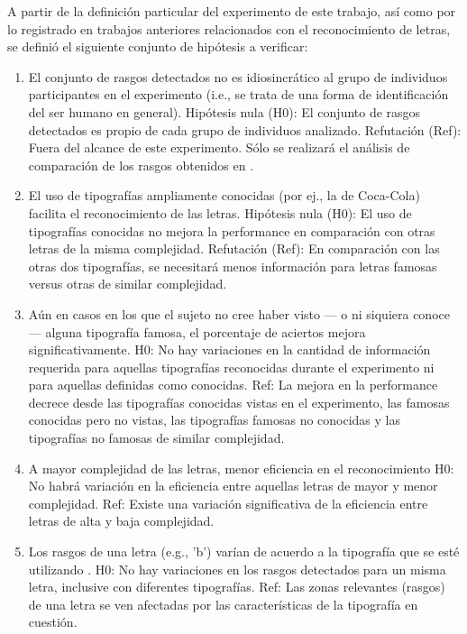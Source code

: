 \documentclass[runningheads,a4paper]{llncs}
\begin{document}
A partir de la definición particular del experimento de este trabajo, así como por lo registrado en trabajos anteriores relacionados con el reconocimiento de letras, se definió el siguiente conjunto de hipótesis a verificar:
\begin{enumerate}
 \item El conjunto de rasgos detectados no es idiosincrático al grupo de individuos participantes en el experimento (i.e., se trata de una forma de identificación del ser humano en general).
    \subitem Hipótesis nula (H0): El conjunto de rasgos detectados es propio de cada grupo de individuos analizado. 
    \subitem Refutación (Ref): Fuera del alcance de este experimento. Sólo se realizará el análisis de comparación de los rasgos obtenidos en \cite{FisetEtAl08:BubblesForLetters}.
 \item El uso de tipografías ampliamente conocidas (por ej., la de Coca-Cola) facilita el reconocimiento de las letras.
    \subitem Hipótesis nula (H0): El uso de tipografías conocidas no mejora la performance en comparación con otras letras de la misma complejidad.
    \subitem Refutación (Ref): En comparación con las otras dos tipografías, se necesitará menos información para letras famosas versus otras de similar complejidad.
 \item Aún en casos en los que el sujeto no cree haber visto --- o ni siquiera conoce --- alguna tipografía famosa, el porcentaje de aciertos mejora significativamente.
    \subitem H0: No hay variaciones en la cantidad de información requerida para aquellas tipografías reconocidas durante el experimento ni para aquellas definidas como conocidas.
    \subitem Ref: La mejora en la performance decrece desde las tipografías conocidas vistas en el experimento, las 
	    famosas conocidas pero no vistas, las tipografías famosas no conocidas y las tipografías no famosas de similar complejidad.
 \item A mayor complejidad de las letras, menor eficiencia en el reconocimiento \cite{PelliEtAl06:LetterIdentification}
    \subitem H0: No habrá variación en la eficiencia entre aquellas letras de mayor y menor complejidad.
    \subitem Ref: Existe una variación significativa de la eficiencia entre letras de alta y baja complejidad.
 \item Los rasgos de una letra (e.g., 'b') varían de acuerdo a la tipografía que se esté utilizando \cite{PelliEtAl06:LetterIdentification}.
    \subitem H0: No hay variaciones en los rasgos detectados para un misma letra, inclusive con diferentes tipografías.
    \subitem Ref: Las zonas relevantes (rasgos) de una letra se ven afectadas por las características de la tipografía en cuestión.

\end{enumerate}
\end{document}
